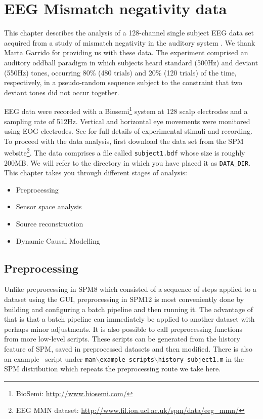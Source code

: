 \chapter{EEG Mismatch negativity data\label{Chap:data:mmn}}

This chapter describes the analysis of a 128-channel single subject EEG data set acquired from a study of mismatch negativity in the auditory system \cite{marta_mmndcm}. We thank Marta Garrido for providing us with these data. The experiment comprised an auditory oddball paradigm in which subjects heard standard (500Hz) and deviant (550Hz) tones, occurring 80\% (480 trials) and 20\% (120 trials) of the time, respectively, in a pseudo-random sequence subject to the constraint that two deviant tones did not occur together.

EEG data were recorded with a Biosemi\footnote{BioSemi: \url{http://www.biosemi.com/}} system at 128 scalp electrodes and a sampling rate of 512Hz. Vertical and horizontal eye movements were monitored using EOG electrodes. See \cite{marta_mmndcm} for full details of experimental stimuli and recording. To proceed with the data analysis, first download the  data set from the SPM website\footnote{EEG MMN dataset: \url{http://www.fil.ion.ucl.ac.uk/spm/data/eeg\_mmn/}}. The data comprises a file called \texttt{subject1.bdf} whose size is roughly 200MB. We will refer to the directory in which you have placed it as \texttt{DATA\_DIR}. This chapter takes you through different stages of analysis:

\begin{itemize}
\item{Preprocessing}
\item{Sensor space analysis}
\item{Source reconstruction}
\item{Dynamic Causal Modelling}
\end{itemize}

\section{Preprocessing}

Unlike preprocessing in SPM8 which consisted of a sequence of steps applied to a dataset using the GUI, preprocessing in SPM12 is most conveniently done by building and configuring a batch pipeline and then running it. The advantage of that is that a batch pipeline can immediately be applied to another dataset with perhaps minor adjustments. It is also possible to call preprocessing functions from more low-level scripts. These scripts can be generated from the history feature of SPM, saved in preprocessed datasets and then modified.  There is also an example \matlab\ script under \texttt{man$\backslash$example\_scripts$\backslash$history\_subject1.m} in the SPM distribution which repeats the preprocessing route we take here.

